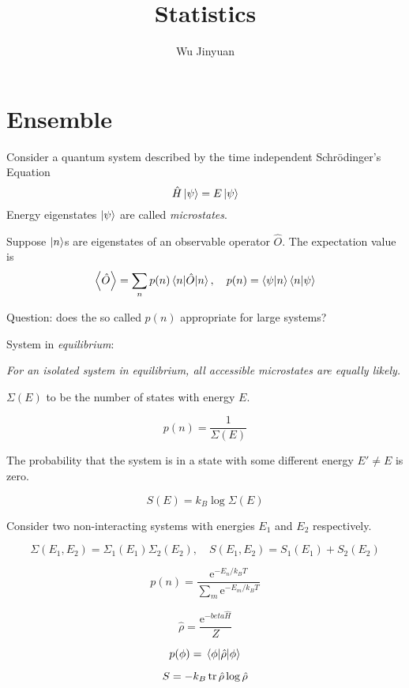 \documentclass[a4paper]{article}
\title{Statistics}
\author{Wu Jinyuan}
\newcommand*{\ee}{\mathrm{e}}
\newcommand*{\scheq}{Schr\"odinger's Equation}
\begin{document}
\maketitle

\section{Ensemble}

Consider a quantum system described by the time independent \scheq 
\[
    \hat{H} \ket{\psi} = E \ket{\psi}
\]
Energy eigenstates $\ket{\psi}$ are called \emph{microstates}.

Suppose $\ket{n}$s are eigenstates of an observable operator $\hat{O}$. 
The expectation value is
\[
    \expval{\hat{O}} = \sum_n p(n) \mel{n}{\hat{O}}{n}, \quad p(n) = \braket{\psi}{n} \braket{n}{\psi}
\] 

Question: does the so called $p(n)$ appropriate for large systems?

System in \emph{equilibrium}: 

\emph{For an isolated system in equilibrium, all accessible microstates are equally likely.}

$\Sigma(E)$ to be the number of states with energy $E$.

\begin{equation}
    p(n) = \frac{1}{\Sigma(E)}
\end{equation}

The probability that the system is in a state with some different energy $E' \neq E$ is zero.

\begin{equation}
    S(E) = k_B \log \Sigma(E)
\end{equation}

Consider two non-interacting systems with energies $E_1$ and $E_2$ respectively. 

\begin{equation}
    \Sigma(E_1, E_2) = \Sigma_1 (E_1) \Sigma_2 (E_2), \quad 
    S(E_1, E_2) = S_1(E_1) + S_2(E_2)
\end{equation}

\begin{equation}
    p(n) = \frac{\ee^{-E_n / k_B T}}{\sum_m \ee^{-E_m / k_B T}}
\end{equation}

\begin{equation}
    \hat{\rho} = \frac{\ee^{-beta \hat{H}}}{Z}
\end{equation}

\begin{equation}
    p(\phi) = \expval{\hat{\rho}}{\phi}
\end{equation}

\[
    S = -k_B \tr \hat{\rho} \log \hat{\rho}
\]
\end{document}
